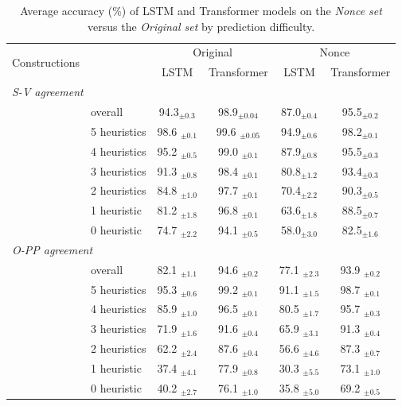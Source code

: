 \begin{table}[ht]
  \centering
  \begin{tabular}{llcccc}
    \toprule
    \multirow{2}{*}{Constructions} & &\multicolumn{2}{c}{Original} & \multicolumn{2}{c}{Nonce}\\
      &&LSTM&Transformer &LSTM& Transformer\\
    \midrule
    \multicolumn{6}{l}{\textit{S-V agreement}} \\
      &overall & 94.3$_{\pm 0.3}$& 98.9$_{\pm 0.04}$    &87.0$_{\pm 0.4}$&95.5$_{\pm 0.2}$\\\cline{2-6}
      &5 heuristics &98.6 $_{\pm 0.1}$&99.6 $_{\pm 0.05}$&94.9$_{\pm 0.6}$&98.2$_{\pm 0.1}$\\
      &4 heuristics &95.2 $_{\pm 0.5}$&99.0 $_{\pm 0.1}$ &87.9$_{\pm 0.8}$&95.5$_{\pm 0.3}$\\
      &3 heuristics &91.3 $_{\pm 0.8}$&98.4 $_{\pm 0.1}$ &80.8$_{\pm 1.2}$&93.4$_{\pm 0.3}$\\
      &2 heuristics &84.8 $_{\pm 1.0}$&97.7 $_{\pm 0.1}$& 70.4$_{\pm 2.2}$ &90.3$_{\pm 0.5}$\\    
      &1 heuristic &81.2 $_{\pm 1.8}$&96.8 $_{\pm 0.1}$ &63.6$_{\pm 1.8}$&88.5$_{\pm 0.7}$\\
      &0 heuristic  &74.7 $_{\pm 2.2}$&94.1 $_{\pm 0.5}$ &58.0$_{\pm 3.0}$&82.5$_{\pm 1.6}$\\
    \midrule
    \multicolumn{6}{l}{\textit{O-PP agreement}} \\
     \phantom{ab} &overall  & 82.1 $_{\pm 1.1}$   & 94.6 $_{\pm 0.2}$ &77.1 $_{\pm 2.3}$&93.9 $_{\pm 0.2}$\\\cline{2-6}
     \phantom{ab} &5 heuristics &95.3 $_{\pm 0.6}$ & 99.2 $_{\pm 0.1}$ &91.1 $_{\pm 1.5}$&98.7 $_{\pm 0.1}$\\
     \phantom{ab} &4 heuristics &85.9 $_{\pm 1.0}$ & 96.5 $_{\pm 0.1}$ &80.5 $_{\pm 1.7}$&95.7 $_{\pm 0.3}$\\
     \phantom{ab} &3 heuristics & 71.9 $_{\pm 1.6}$ & 91.6 $_{\pm 0.4}$&65.9 $_{\pm 3.1}$&91.3 $_{\pm 0.4}$\\
     \phantom{ab} &2 heuristics & 62.2 $_{\pm 2.4}$& 87.6 $_{\pm 0.4}$&56.6 $_{\pm 4.6}$&87.3 $_{\pm 0.7}$\\    
     \phantom{ab} &1 heuristic & 37.4 $_{\pm 4.1}$& 77.9 $_{\pm 0.8}$&30.3 $_{\pm 5.5}$&73.1 $_{\pm 1.0}$\\
    \phantom{ab} &0 heuristic &40.2 $_{\pm 2.7}$ & 76.1 $_{\pm 1.0}$&35.8 $_{\pm 5.0}$&69.2 $_{\pm 0.5}$\\
    
    \bottomrule
  \end{tabular}
\caption{Average accuracy (\%) of LSTM and Transformer models on the \textit{Nonce set} versus the \textit{Original set} by prediction difficulty. \label{tab:nonce_heuristics}
}
\end{table}




